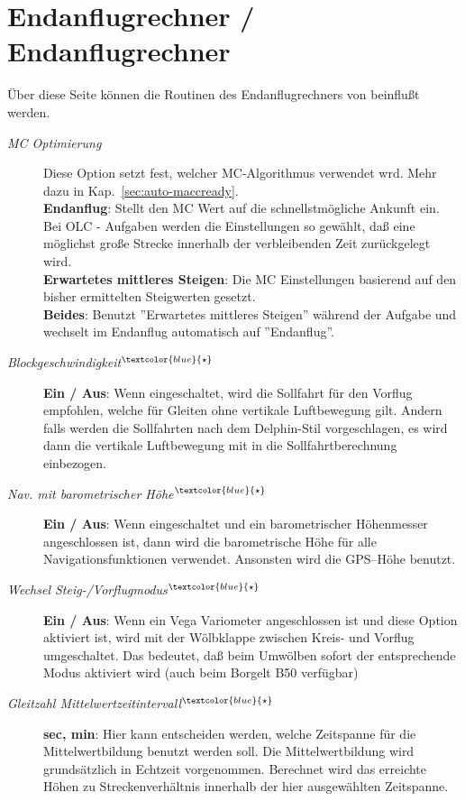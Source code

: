 \section{Endanflugrechner / Endanflugrechner}\label{sec:final-glide}
Über diese Seite können die Routinen des Endanflugrechners von \xc  beinflußt werden.

\begin{description}
\item[\textit{MC Optimierung}]  Diese Option setzt fest, welcher MC-Algorithmus verwendet wrd.
Mehr dazu in Kap.~\ref{sec:auto-maccready}. \\
   {\bf Endanflug}: Stellt den MC Wert auf die schnellstmögliche Ankunft ein.
   Bei OLC - Aufgaben werden die Einstellungen  so gewählt, daß  eine möglichst große Strecke innerhalb der verbleibenden Zeit zurückgelegt wird.\\
   {\bf Erwartetes mittleres Steigen}: Die MC Einstellungen basierend auf den bisher ermittelten Steigwerten gesetzt.\\
   {\bf Beides}: Benutzt ''Erwartetes mittleres Steigen'' während der Aufgabe und wechselt im Endanflug automatisch auf  ''Endanflug''.
\item[\textit{Blockgeschwindigkeit$^{\textcolor{blue}{\star}}$}] {\bf Ein / Aus}: Wenn eingeschaltet, wird die Sollfahrt für den Vorflug empfohlen, welche für Gleiten ohne vertikale Luftbewegung gilt.
Andern falls werden die Sollfahrten nach dem Delphin-Stil vorgeschlagen, es wird dann die vertikale Luftbewegung mit in die Sollfahrtberechnung
einbezogen.
\item[\textit{Nav. mit barometrischer Höhe$^{\textcolor{blue}{\star}}$}] {\bf Ein / Aus}: Wenn eingeschaltet und ein barometrischer Höhenmesser angeschlossen ist, dann wird die barometrische Höhe für alle Navigationsfunktionen verwendet. Ansonsten wird die GPS--Höhe benutzt.
\item[\textit{Wechsel Steig-/Vorflugmodus$^{\textcolor{blue}{\star}}$}] {\bf Ein / Aus}: Wenn ein Vega Variometer angeschlossen ist und diese Option aktiviert ist, wird mit der Wölbklappe zwischen Kreis- und Vorflug umgeschaltet.
Das bedeutet, daß  beim Umwölben sofort der entsprechende Modus aktiviert wird (auch beim Borgelt B50 verfügbar)
\item[\textit{Gleitzahl Mittelwertzeitintervall$^{\textcolor{blue}{\star}}$}] {\bf sec, min}: Hier kann entscheiden werden, welche Zeitspanne für die Mittelwertbildung benutzt werden soll.
Die Mittelwertbildung wird grundsätzlich in Echtzeit vorgenommen. Berechnet wird das erreichte Höhen zu Streckenverhältnis
innerhalb der hier ausgewählten Zeitspanne.


\end{description}
